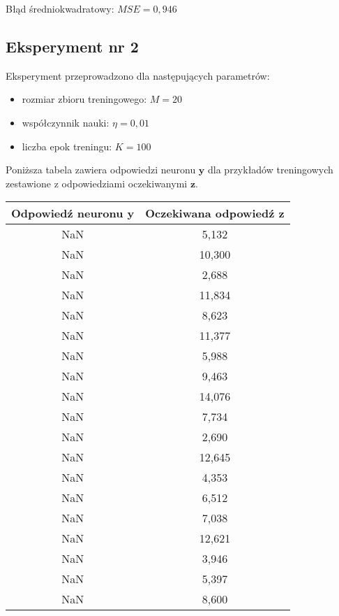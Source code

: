 \documentclass[12pt]{article}
\begin{document}
Błąd średniokwadratowy: $MSE = 0,946$

\subsection{Eksperyment nr 2}

Eksperyment przeprowadzono dla następujących parametrów:

\begin{itemize}
\item rozmiar zbioru treningowego: $M = 20$ 
\item współczynnik nauki: $\eta = 0,01$
\item liczba epok treningu: $K = 100$
\end{itemize}

Poniższa tabela zawiera odpowiedzi neuronu $\textbf{y}$ dla przykładów treningowych zestawione z odpowiedziami oczekiwanymi $\textbf{z}$.

\clearpage

\begin{table}
\begin{tabular}{|c|c|}
\hline 
Odpowiedź neuronu $\textbf{y}$ & Oczekiwana odpowiedź $\textbf{z}$ \\ 
\hline 
NaN & 5,132 \\ \hline 
NaN & 10,300 \\ \hline 
NaN & 2,688 \\ \hline 
NaN & 11,834 \\ \hline 
NaN & 8,623 \\ \hline 
NaN & 11,377 \\ \hline 
NaN & 5,988 \\ \hline 
NaN & 9,463 \\ \hline 
NaN & 14,076 \\ \hline 
NaN & 7,734 \\ \hline 
NaN & 2,690 \\ \hline 
NaN & 12,645 \\ \hline 
NaN & 4,353 \\ \hline 
NaN & 6,512 \\ \hline 
NaN & 7,038 \\ \hline 
NaN & 12,621 \\ \hline 
NaN & 3,946 \\ \hline 
NaN & 5,397 \\ \hline 
NaN & 8,600 \\ \hline
\end{tabular} 
\end{table}
\end{document}
